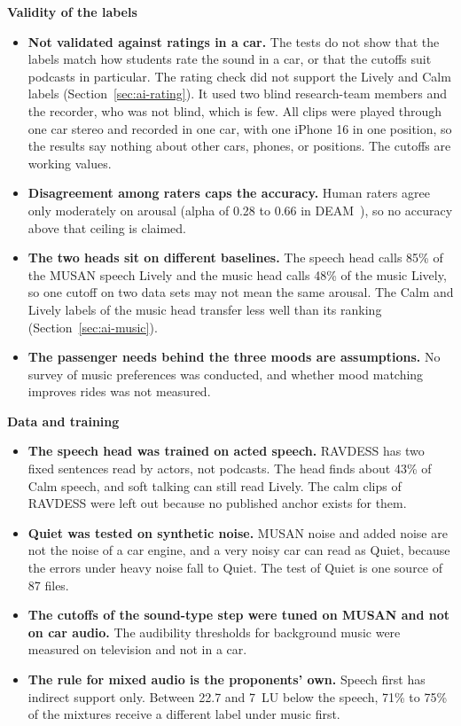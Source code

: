 \textbf{Validity of the labels}
\begin{itemize}
    \item \textbf{Not validated against ratings in a car.} The tests do not show that the labels match how students rate the sound in a car, or that the cutoffs suit podcasts in particular. The rating check did not support the Lively and Calm labels (Section~\ref{sec:ai-rating}). It used two blind research-team members and the recorder, who was not blind, which is few. All clips were played through one car stereo and recorded in one car, with one iPhone 16 in one position, so the results say nothing about other cars, phones, or positions. The cutoffs are working values.
    \item \textbf{Disagreement among raters caps the accuracy.} Human raters agree only moderately on arousal (alpha of 0.28 to 0.66 in DEAM~\cite{aljanaki2017deam}), so no accuracy above that ceiling is claimed.
    \item \textbf{The two heads sit on different baselines.} The speech head calls 85\% of the MUSAN speech Lively and the music head calls 48\% of the music Lively, so one cutoff on two data sets may not mean the same arousal. The Calm and Lively labels of the music head transfer less well than its ranking (Section~\ref{sec:ai-music}).
    \item \textbf{The passenger needs behind the three moods are assumptions.} No survey of music preferences was conducted, and whether mood matching improves rides was not measured.
\end{itemize}

\textbf{Data and training}
\begin{itemize}
    \item \textbf{The speech head was trained on acted speech.} RAVDESS has two fixed sentences read by actors, not podcasts. The head finds about 43\% of Calm speech, and soft talking can still read Lively. The calm clips of RAVDESS were left out because no published anchor exists for them.
    \item \textbf{Quiet was tested on synthetic noise.} MUSAN noise and added noise are not the noise of a car engine, and a very noisy car can read as Quiet, because the errors under heavy noise fall to Quiet. The test of Quiet is one source of 87 files.
    \item \textbf{The cutoffs of the sound-type step were tuned on MUSAN and not on car audio.} The audibility thresholds for background music were measured on television and not in a car.
    \item \textbf{The rule for mixed audio is the proponents' own.} Speech first has indirect support only. Between 22.7 and 7~LU below the speech, 71\% to 75\% of the mixtures receive a different label under music first.
\end{itemize}

